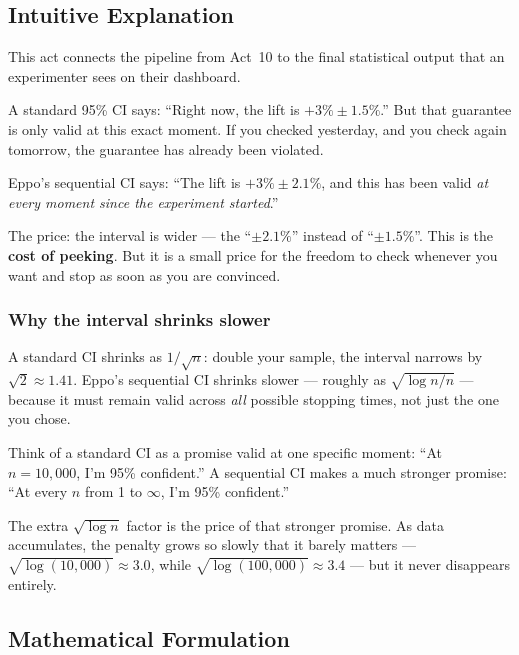\documentclass[12pt, a4paper]{article}
\begin{document}
\subsection{Intuitive Explanation}

\begin{intuition}
This act connects the pipeline from Act~10 to the final statistical output
that an experimenter sees on their dashboard.

A standard 95\% CI says: ``Right now, the lift is $+3\% \pm 1.5\%$.''  But
that guarantee is only valid at this exact moment.  If you checked yesterday,
and you check again tomorrow, the guarantee has already been violated.

Eppo's sequential CI says: ``The lift is $+3\% \pm 2.1\%$, and this has been
valid \emph{at every moment since the experiment started}.''

The price: the interval is wider --- the ``$\pm 2.1\%$'' instead of
``$\pm 1.5\%$''.  This is the \textbf{cost of peeking}.  But it is a small
price for the freedom to check whenever you want and stop as soon as you are
convinced.
\end{intuition}

\subsubsection*{Why the interval shrinks slower}

A standard CI shrinks as $1/\sqrt{n}$: double your sample, the interval
narrows by $\sqrt{2} \approx 1.41$.  Eppo's sequential CI shrinks slower ---
roughly as $\sqrt{\log n / n}$ --- because it must remain valid across
\emph{all} possible stopping times, not just the one you chose.

\begin{plainlanguage}
Think of a standard CI as a promise valid at one specific moment: ``At
$n = 10{,}000$, I'm 95\% confident.''  A sequential CI makes a much
stronger promise: ``At every $n$ from 1 to $\infty$, I'm 95\% confident.''

The extra $\sqrt{\log n}$ factor is the price of that stronger promise.
As data accumulates, the penalty grows so slowly that it barely matters ---
$\sqrt{\log(10{,}000)} \approx 3.0$, while $\sqrt{\log(100{,}000)} \approx
3.4$ --- but it never disappears entirely.
\end{plainlanguage}

\subsection{Mathematical Formulation}
\end{document}
